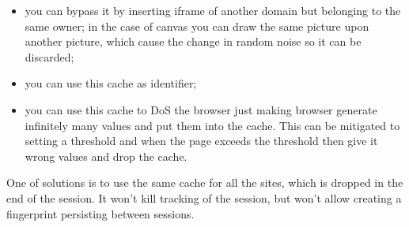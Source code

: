 \documentclass[letterpaper,14pt]{article}
\begin{document}
\begin{itemize}
\itemsep1pt\parskip0pt
\item
  you can bypass it by inserting iframe of another domain but belonging to the same owner; in the case of canvas you can draw the same picture upon another picture, which cause the change in random noise so it can be discarded;
\item
  you can use this cache as identifier;
\item
  you can use this cache to DoS the browser just making browser generate infinitely many values and put them into the cache. This can be mitigated to setting a threshold and when the page exceeds the threshold then give it wrong values and drop the cache.
\end{itemize}

One of solutions is to use the same cache for all the sites, which is dropped in the end of the session. It won't kill tracking of the session, but won't allow creating a fingerprint persisting between sessions.
\end{document}
